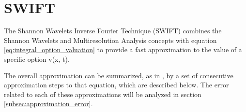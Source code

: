 \documentclass[12,twoside]{mammeTFM}
\theoremstyle{definition}
\theoremstyle{remark}
\begin{document}

\section{SWIFT}

The Shannon Wavelets Inverse Fourier Technique (SWIFT) combines the Shannon Wavelets and Multiresolution Analysis concepts with equation \ref{eq:integral_option_valuation} to provide a fast approximation to the value of a specific option v(x, t).

The overall approximation can be summarized, as in \cite{mar17}, by a set of consecutive approximation steps to that equation, which are described below. The error related to each of these approximations will be analyzed in section \ref{subsec:approximation_error}.
\end{document}
